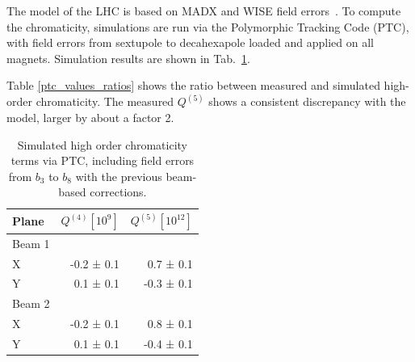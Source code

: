 The model of the LHC is based on MADX and WISE field errors~\cite{p_hagen_wise_2006}. To compute the
chromaticity, simulations are run via the Polymorphic Tracking Code (PTC), with field errors from
sextupole to decahexapole loaded and applied on all magnets. Simulation results are shown in Tab.~\ref{ptc_values}.

Table \ref{ptc_values_ratios} shows the ratio between measured and simulated high-order chromaticity. The measured $Q^{(5)}$ shows a consistent discrepancy with the model, larger by about a factor 2.

\begin{table}[tbh]
    \centering
    \small
    \begin{tabular}{|l||r|r|}
    \hline
        Plane     &  $Q^{(4)} [10^9]$  &  $Q^{(5)} 
        [10^{12}]$ \\\hline\hline
        Beam 1    &              &               \\
        X         & -0.2 ± 0.1 & 0.7 ± 0.1  \\
        Y         &  0.1 ± 0.1 & -0.3 ± 0.1  \\ \hline
        Beam 2    &  &   \\
        X         & -0.2 ± 0.1 &  0.8 ± 0.1  \\
        Y         &  0.1 ± 0.1 & -0.4 ± 0.1 \\ \hline
    \end{tabular}
    \caption{Simulated high order chromaticity terms via PTC, including field errors from $b_3$ to $b_8$ with the previous beam-based corrections.}
    \label{ptc_values}
\end{table}

